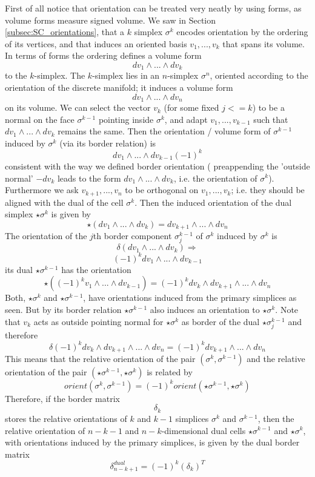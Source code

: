 \begin{appendix}
First of all notice that orientation can be treated very neatly by using forms, as volume forms measure signed volume.
We saw in Section \ref{subsec:SC_orientations}, that a $k$ simplex $\sigma^k$ encodes orientation by the ordering of its vertices, and that induces an oriented basis $v_1,...,v_k$ that spans its volume. In terms of forms the ordering defines a volume form
\[dv_1\wedge...\wedge dv_k\]
to the $k$-simplex. The $k$-simplex lies in an $n$-simplex $\sigma^n$, oriented according to the orientation of the discrete manifold; it induces a volume form
\[dv_1\wedge ... \wedge dv_n\]
on its volume. We can select the vector $v_k$ (for some fixed $j<=k$) to be a normal on the face $\sigma^{k-1}$ pointing inside $\sigma^k$, and adapt $v_1,...,v_{k-1}$ such that $dv_1\wedge...\wedge dv_k$ remains the same. Then the orientation / volume form  of $\sigma^{k-1}$ induced by $\sigma^k$ (via its border relation) is
\[dv_1\wedge... \wedge dv_{k-1} (-1)^{k}\]
consistent with the way we defined border orientation ( preappending the 'outside normal' $-dv_k$ leads to the form $dv_1\wedge ... \wedge dv_k$, i.e. the orientation of $\sigma^k$). Furthermore we ask $v_{k+1},...,v_{n}$ to be orthogonal on $v_{1},...,v_{k}$; i.e. they should be aligned with the dual of the cell $\sigma^k$. Then the induced orientation of the dual simplex $\star \sigma^k$ is given by
\[\star (dv_1\wedge...\wedge dv_k) = dv_{k+1}\wedge...\wedge dv_{n}\]
The orientation of the $j$th border component $\sigma_j^{k-1}$ of $\sigma^k$ induced by $\sigma^k$ is
\[\delta (dv_1\wedge...\wedge dv_k) \Rightarrow\]
\[(-1)^{k}dv_1\wedge...\wedge dv_{k-1}\]
its dual $\star \sigma^{k-1}$ has the orientation
\[\star ((-1)^{k} v_1\wedge...\wedge dv_{k-1}) = (-1)^{k} dv_k \wedge dv_{k+1}\wedge ... \wedge dv_n\]
Both, $\star \sigma^k$ and $\star \sigma^{k-1}$, have orientations induced from the primary simplices as seen. But by its border relation $\star \sigma^{k-1}$ also induces an orientation to $\star \sigma^k$. Note that $v_k$ acts as outside pointing normal for $\star \sigma^k$ as border of the dual $\star \sigma_j^{k-1}$ and therefore
\[\delta (-1)^{k} dv_k \wedge dv_{k+1}\wedge ... \wedge dv_n = (-1)^{k} dv_{k+1}\wedge ... \wedge dv_n\]
This means that the relative orientation of the pair $(\sigma^k, \sigma^{k-1})$ and the relative orientation of the pair $(\star \sigma^{k-1}, \star \sigma^k)$ is related by
\[orient(\sigma^k, \sigma^{k-1}) = (-1)^{k} orient(\star \sigma^{k-1}, \star \sigma^k)\]
Therefore, if the border matrix
\[\delta_k\]
stores the relative orientations of $k$ and $k-1$ simplices $\sigma^k$ and $\sigma^{k-1}$, then the relative orientation of $n-k-1$ and $n-k$-dimensional dual cells $\star \sigma^{k-1}$  and $\star \sigma^k$, with orientations induced by the primary simplices, is given by the dual border matrix
\[\delta_{n-k+1}^{dual} = (-1)^{k} (\delta_k)^T\]

\end{appendix}